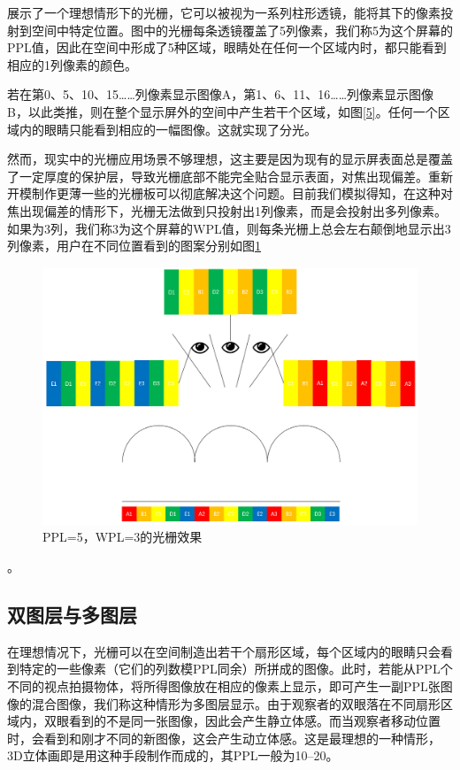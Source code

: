 \documentclass[12pt,a4paper]{article}
\begin{document}
展示了一个理想情形下的光栅，它可以被视为一系列柱形透镜，能将其下的像素投射到空间中特定位置。图中的光栅每条透镜覆盖了5列像素，我们称5为这个屏幕的PPL值，因此在空间中形成了5种区域，眼睛处在任何一个区域内时，都只能看到相应的1列像素的颜色。

若在第0、5、10、15……列像素显示图像A，第1、6、11、16……列像素显示图像B，以此类推，则在整个显示屏外的空间中产生若干个区域，如图\ref{5}。任何一个区域内的眼睛只能看到相应的一幅图像。这就实现了分光。

然而，现实中的光栅应用场景不够理想，这主要是因为现有的显示屏表面总是覆盖了一定厚度的保护层，导致光栅底部不能完全贴合显示表面，对焦出现偏差。重新开模制作更薄一些的光栅板可以彻底解决这个问题。目前我们模拟得知，在这种对焦出现偏差的情形下，光栅无法做到只投射出1列像素，而是会投射出多列像素。如果为3列，我们称3为这个屏幕的WPL值，则每条光栅上总会左右颠倒地显示出3列像素，用户在不同位置看到的图案分别如图\ref{6}%
\begin{figure}[htbp]
    \centering
    \includegraphics[width=\linewidth]{6}
    \caption{PPL=5，WPL=3的光栅效果}
    \label{6}
\end{figure}%
。

\subsection{双图层与多图层}

在理想情况下，光栅可以在空间制造出若干个扇形区域，每个区域内的眼睛只会看到特定的一些像素（它们的列数模PPL同余）所拼成的图像。此时，若能从PPL个不同的视点拍摄物体，将所得图像放在相应的像素上显示，即可产生一副PPL张图像的混合图像，我们称这种情形为多图层显示。由于观察者的双眼落在不同扇形区域内，双眼看到的不是同一张图像，因此会产生静立体感。而当观察者移动位置时，会看到和刚才不同的新图像，这会产生动立体感。这是最理想的一种情形，3D立体画即是用这种手段制作而成的，其PPL一般为10--20。
\end{document}
